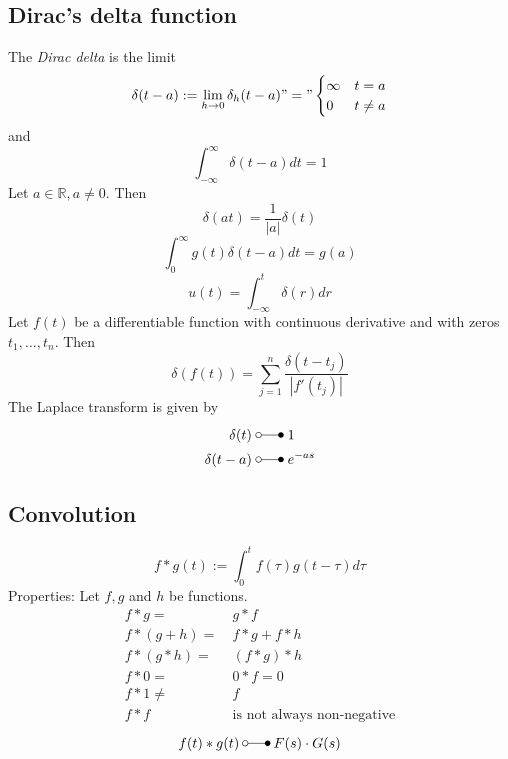\subsection{Dirac's delta function}
The \textit{Dirac delta} is the limit
\begin{equation*}
    \delta(t-a):=\lim_{h\to0}\delta_h(t-a)"="
    \begin{cases}
        \infty&t=a\\
        0&t\ne a
    \end{cases}
\end{equation*}
and
\begin{equation*}
    \int_{-\infty}^{\infty}\delta(t-a)dt=1
\end{equation*}
Let $a \in \mathbb{R}, a \ne 0$. Then
\begin{equation*}
    \delta(at)=\frac1{|a|}\delta(t)
\end{equation*}
\begin{equation*}
    \int_{0}^{\infty} g(t)\delta(t-a)dt=g(a)
\end{equation*}
\begin{equation*}
    u(t)=\int_{-\infty}^{t}\delta(r)dr
\end{equation*}
Let $f(t)$ be a differentiable function with continuous derivative and with zeros $t_1,\dots,t_n$. Then
\begin{equation*}
    \delta(f(t))=\sum_{j=1}^n\frac{\delta(t-t_j)}{|f'(t_j)|}
\end{equation*}
The Laplace transform is given by
\begin{align*}
    \delta(t) &\;\laplace\; 1 \\
    \delta(t-a) &\;\laplace\; e^{-as}
\end{align*}

\subsection{Convolution}
\begin{equation*}
    f*g(t):=\int_{0}^{t}f(\tau)g(t-\tau)d\tau
\end{equation*}
Properties: Let $f,g$ and $h$ be functions.
\begin{align*}
    f*g =&\ g*f \\
    f*(g+h) =&\ f*g+f*h \\
    f*(g*h) =&\ (f*g)*h \\
    f*0 =&\ 0*f=0 \\
    f*1 \ne&\ f \\
    f*f \;&\ \text{is not always non-negative}
\end{align*}
\begin{equation*}
    f(t)*g(t) \:\laplace\: F(s)\cdot G(s)
\end{equation*}

